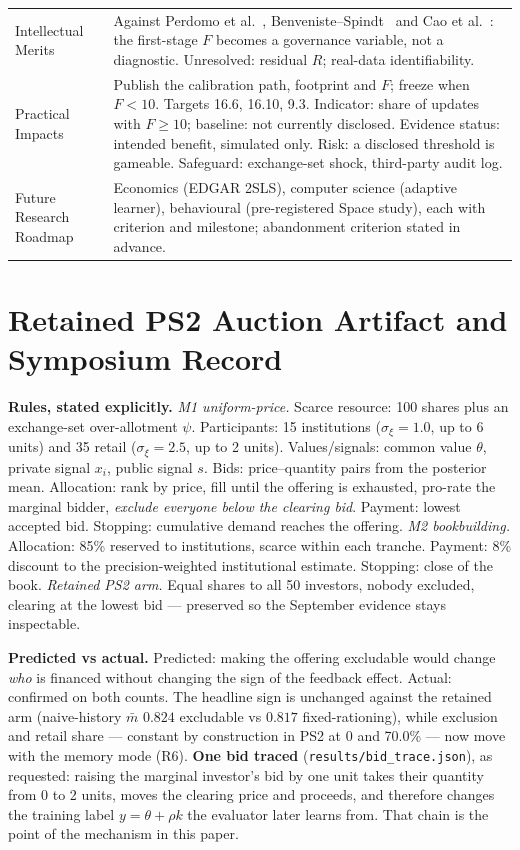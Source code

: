 \begin{table}[H]
\begin{tabularx}{\textwidth}{@{}p{}Y@{}}
Intellectual Merits & Against Perdomo et al.~\cite{perdomo2020}, Benveniste--Spindt~\cite{benveniste1989} and Cao et al.~\cite{cao2023machine}: the first-stage $F$ becomes a governance variable, not a diagnostic. Unresolved: residual $R$; real-data identifiability.\\
Practical Impacts & Publish the calibration path, footprint and $F$; freeze when $F<10$. Targets 16.6, 16.10, 9.3. Indicator: share of updates with $F\ge10$; baseline: not currently disclosed. Evidence status: intended benefit, simulated only. Risk: a disclosed threshold is gameable. Safeguard: exchange-set shock, third-party audit log.\\
Future Research Roadmap & Economics (EDGAR 2SLS), computer science (adaptive learner), behavioural (pre-registered Space study), each with criterion and milestone; abandonment criterion stated in advance.\\
\bottomrule
\end{tabularx}\end{table}

\section{Retained PS2 Auction Artifact and Symposium Record}
\textbf{Rules, stated explicitly.} \emph{M1 uniform-price.} Scarce resource: 100 shares plus an exchange-set over-allotment $\psi$. Participants: 15 institutions ($\sigma_\xi=1.0$, up to 6 units) and 35 retail ($\sigma_\xi=2.5$, up to 2 units). Values/signals: common value $\theta$, private signal $x_i$, public signal $s$. Bids: price--quantity pairs from the posterior mean. Allocation: rank by price, fill until the offering is exhausted, pro-rate the marginal bidder, \emph{exclude everyone below the clearing bid}. Payment: lowest accepted bid. Stopping: cumulative demand reaches the offering. \emph{M2 bookbuilding.} Allocation: 85\% reserved to institutions, scarce within each tranche. Payment: 8\% discount to the precision-weighted institutional estimate. Stopping: close of the book. \emph{Retained PS2 arm.} Equal shares to all 50 investors, nobody excluded, clearing at the lowest bid --- preserved so the September evidence stays inspectable.

\textbf{Predicted vs actual.} Predicted: making the offering excludable would change \emph{who} is financed without changing the sign of the feedback effect. Actual: confirmed on both counts. The headline sign is unchanged against the retained arm (naive-history $\bar m$ $0.824$ excludable vs $0.817$ fixed-rationing), while exclusion and retail share --- constant by construction in PS2 at 0 and 70.0\% --- now move with the memory mode (R6). \textbf{One bid traced} (\texttt{results/bid\_trace.json}), as requested: raising the marginal investor's bid by one unit takes their quantity from 0 to 2 units, moves the clearing price and proceeds, and therefore changes the training label $y=\theta+\rho k$ the evaluator later learns from. That chain is the point of the mechanism in this paper.

